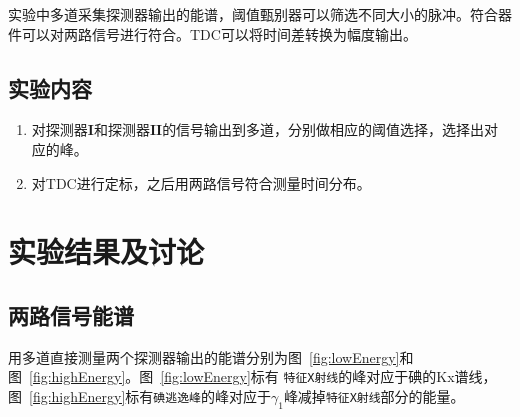 \documentclass[12pt]{ctexart}
\begin{document}
实验中多道采集探测器输出的能谱，阈值甄别器可以筛选不同大小的脉冲。符合器件可以对两路信号进行符合。TDC可以将时间差转换为幅度输出。
\subsection{实验内容}
\begin{enumerate}
    \item 对探测器$\mathbf{I}$和探测器$\mathbf{II}$的信号输出到多道，分别做相应的阈值选择，选择出对应的峰。
    \item 对TDC进行定标，之后用两路信号符合测量时间分布。
\end{enumerate}
\section{实验结果及讨论}
\subsection{两路信号能谱}
用多道直接测量两个探测器输出的能谱分别为图~\ref{fig:lowEnergy}和图~\ref{fig:highEnergy}。图~\ref{fig:lowEnergy}标有
\texttt{特征X射线}的峰对应于碘的Kx谱线，图~\ref{fig:highEnergy}标有\texttt{碘逃逸峰}的峰对应于$\gamma_1$峰减掉\texttt{特征X射线}部分的能量。
\end{document}
